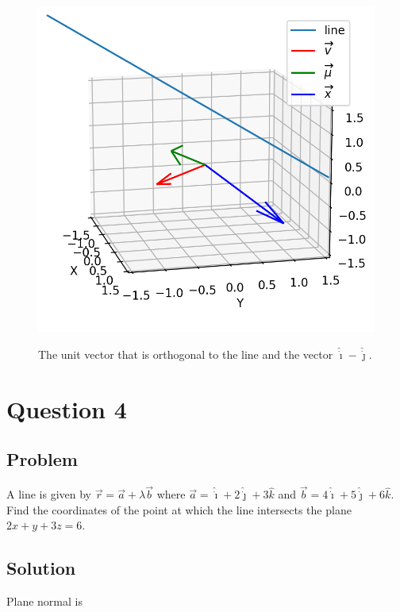 \documentclass[12pt]{article}
\begin{document}
\begin{figure}[H]
    \includegraphics[width=\linewidth]{Q3.png}\label{fig:Q3}
    \caption{The unit vector that is orthogonal to the line and the vector
        \(\hat{\dot{\imath}} - \hat{\dot{\jmath}}\).\cite{El-Deeb_PEU-218_Assignments_py}}
\end{figure}

\section{Question 4}

\subsection{Problem}

A line is given by \(\vec{r} = \vec{a} + \lambda \vec{b}\)
where \(\vec{a} = \hat{\dot{\imath}} + 2 \hat{\dot{\jmath}} + 3 \hat{k}\)
and \(\vec{b} = 4 \hat{\dot{\imath}} + 5 \hat{\dot{\jmath}} + 6 \hat{k}\).
Find the coordinates of the point at which the line intersects the plane \(2x + y + 3z = 6\).

\subsection{Solution}

Plane normal is
\end{document}
